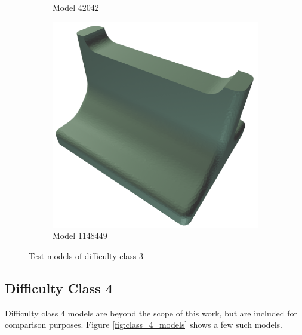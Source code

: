 \begin{figure}[htb]
\begin{subfigure}{0.3\textwidth}
	\caption{Model 42042}
\end{subfigure}
\hfill
\begin{subfigure}{0.3\textwidth}
	\includegraphics[width=\textwidth]{../resources/models/1148449.png}
	\caption{Model 1148449}
\end{subfigure}
\caption{Test models of difficulty class 3}
\label{fig:class_3_models}
\end{figure}

\subsection{Difficulty Class 4}
Difficulty class 4 models are beyond the scope of this work, but are included for comparison purposes.
Figure \ref{fig:class_4_models} shows a few such models.

